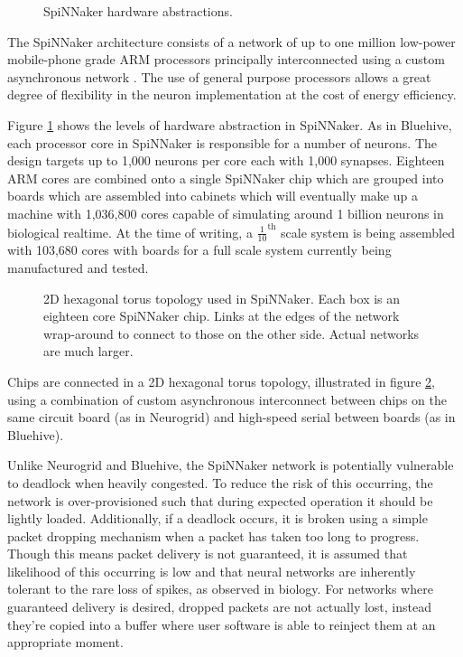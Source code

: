 				\begin{figure}
					
					
					\caption{SpiNNaker hardware abstractions.}
					\label{fig:spinnaker-abstractions}
				\end{figure}
				
				The SpiNNaker architecture consists of a network of up to one million
				low-power mobile-phone grade ARM processors principally interconnected
				using a custom asynchronous network \cite{furber06}. The use of general
				purpose processors allows a great degree of flexibility in the neuron
				implementation at the cost of energy efficiency. 
				
				Figure \ref{fig:spinnaker-abstractions} shows the levels of hardware
				abstraction in SpiNNaker. As in Bluehive, each processor core in
				SpiNNaker is responsible for a number of neurons. The design targets up
				to 1,000 neurons per core each with 1,000 synapses. Eighteen ARM cores
				are combined onto a single SpiNNaker chip which are grouped into boards
				which are assembled into cabinets which will eventually make up a
				machine with 1,036,800 cores capable of simulating around 1 billion
				neurons in biological realtime.  At the time of writing, a
				$\frac{1}{10}^{\textrm{th}}$ scale system is being assembled with
				103,680 cores with boards for a full scale system currently being
				manufactured and tested.
				
				\begin{figure}
					\center
					
					
					\caption[2D hexagonal torus topology used in SpiNNaker.]{2D hexagonal
					torus topology used in SpiNNaker. Each box is an eighteen core
					SpiNNaker chip. Links at the edges of the network wrap-around to
					connect to those on the other side. Actual networks are much larger.}
					\label{fig:spinn-topology}
				\end{figure}
				
				Chips are connected in a 2D hexagonal torus topology, illustrated in
				figure \ref{fig:spinn-topology}, using a combination of custom
				asynchronous interconnect between chips on the same circuit board (as in
				Neurogrid) and high-speed serial between boards (as in Bluehive).
				
				Unlike Neurogrid and Bluehive, the SpiNNaker network is potentially
				vulnerable to deadlock when heavily congested. To reduce the risk of
				this occurring, the network is over-provisioned such that during
				expected operation it should be lightly loaded. Additionally, if a
				deadlock occurs, it is broken using a simple packet dropping mechanism
				when a packet has taken too long to progress. Though this means packet
				delivery is not guaranteed, it is assumed that likelihood of this
				occurring is low and that neural networks are inherently tolerant to the
				rare loss of spikes, as observed in biology. For networks where
				guaranteed delivery is desired, dropped packets are not actually lost,
				instead they're copied into a buffer where user software is able to
				reinject them at an appropriate moment.
	
